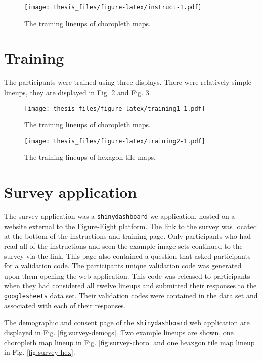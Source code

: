 \documentclass{monashthesis}
\begin{document}
\begin{figure}
\centering
\texttt{[image: thesis\_files/figure-latex/instruct-1.pdf]}
\caption{\label{fig:instruct}The training lineups of choropleth maps.}
\end{figure}

\hypertarget{training}{%
\section{Training}\label{training}}

The participants were trained using three displays. There were relatively simple lineups, they are displayed in Fig. \ref{fig:training1} and Fig. \ref{fig:training2}.

\begin{figure}
\centering
\texttt{[image: thesis\_files/figure-latex/training1-1.pdf]}
\caption{\label{fig:training1}The training lineups of choropleth maps.}
\end{figure}

\begin{figure}
\centering
\texttt{[image: thesis\_files/figure-latex/training2-1.pdf]}
\caption{\label{fig:training2}The training lineups of hexagon tile maps.}
\end{figure}

\hypertarget{survey-application}{%
\section{Survey application}\label{survey-application}}

The survey application was a \texttt{shinydashboard} we application, hosted on a website external to the Figure-Eight platform. The link to the survey was located at the bottom of the instructions and training page. Only participants who had read all of the instructions and seen the example image sets continued to the survey via the link.
This page also contained a question that asked participants for a validation code. The participants unique validation code was generated upon them opening the web application. This code was released to participants when they had considered all twelve lineups and submitted their responses to the \texttt{googlesheets} data set. Their validation codes were contained in the data set and associated with each of their responses.

The demographic and consent page of the \texttt{shinydashboard} web application are displayed in Fig. \ref{fig:survey-demogs}. Two example lineups are shown, one choropleth map lineup in Fig. \ref{fig:survey-choro} and one heaxgon tile map lineup in Fig. \ref{fig:survey-hex}.
\end{document}
